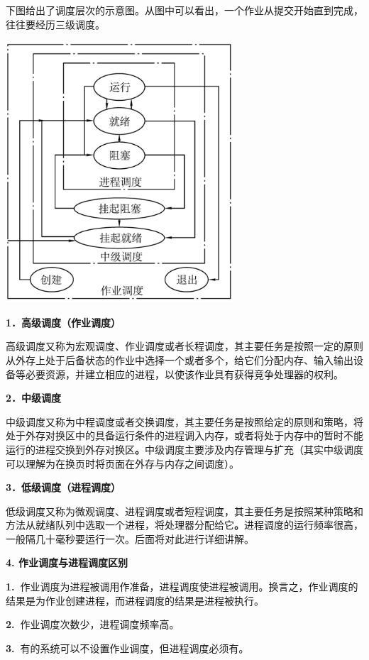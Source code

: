 {下图给出了调度层次的示意图。从图中可以看出，一个作业从提交开始直到完成，往往要经历三级调度。}

{\includegraphics[width=3.33333in,height=3.83333in]{png-jpeg-pics/465B11B15425DACD970C7DB1B32AFF97.png}\\
}

\textbf{{1．高级调度（作业调度）}}

高级调度又称为宏观调度、作业调度或者长程调度，其{主要任务是按照一定的原则从外存上处于后备状态的作业中选择一个或者多个}，给它们分配内存、输入输出设备等必要资源，并建立相应的进程，以使该作业具有获得竞争处理器的权利。

\textbf{{2．中级调度}}

中级调度又称为中程调度或者交换调度，其{主}{要任务是按照给定的原则和策略，将处于外存对换区中的具备运行条件的进程调入内存，或者将处于内存中的暂时不能运行的进程交换到外存对换区}\textbf{。}中级调度主要涉及内存管理与扩充（其实中级调度可以理解为在换页时将页面在外存与内存之间调度）。

\textbf{{3．低级调度（进程调度）}}

低级调度又称为微观调度、进程调度或者短程调度，其{主要任务是按照某种策略和方法从就绪队列中选取一个进程，将处理器分配给它}\textbf{。}进程调度的运行频率很高，一般隔几十毫秒要运行一次。后面将对此进行详细讲解。

\textbf{{4. 作业调度与进程调度区别}}

\textbf{1.~}{作业调度为进程被调用作准备，进程调度使进程被调用。换言之，}{作业调度的结果是为作业创建进程，而进程调度的结果是进程被执行}{。}

\textbf{2.~}作业调度次数少，进程调度频率高。

\textbf{3.~}有的系统可以不设置作业调度，但进程调度必须有。
